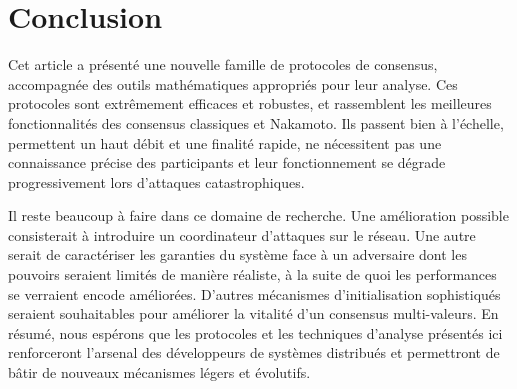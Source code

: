 \documentclass[a4,twocolumn,10pt]{article}
\newcommand{\tronly}[2]{#1}
\theoremstyle{definition}
\begin{document}
\section{Conclusion}
\label{sec:conclusions}
Cet article a présenté une nouvelle famille de protocoles de consensus, accompagnée des outils mathématiques appropriés pour leur analyse.
\tronly{Ces protocoles sont extrêmement efficaces et robustes, et rassemblent les meilleures fonctionnalités des consensus classiques et Nakamoto.}{} 
Ils passent bien à l'échelle, permettent un haut débit et une finalité rapide, ne nécessitent pas une connaissance précise des participants et leur fonctionnement se dégrade progressivement lors d'attaques catastrophiques.

Il reste beaucoup à faire dans ce domaine de recherche. \tronly{
Une amélioration possible consisterait à introduire un coordinateur d'attaques sur le réseau.
Une autre}{Une} serait de caractériser les garanties du système face à un adversaire dont les pouvoirs seraient limités de manière réaliste, à la suite de quoi les performances se verraient encode améliorées. \tronly{D'autres}{Plus} mécanismes d'initialisation sophistiqués seraient souhaitables pour améliorer la vitalité d'un consensus multi-valeurs. 
En résumé, nous espérons que les protocoles et les techniques d'analyse présentés ici renforceront l'arsenal des développeurs de systèmes distribués et permettront de bâtir de nouveaux mécanismes légers et évolutifs.
\end{document}
